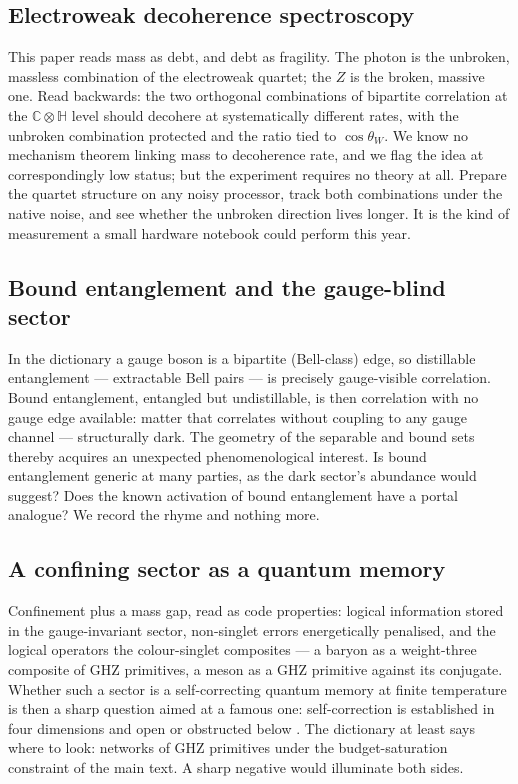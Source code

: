 \subsection{Electroweak decoherence spectroscopy}
\label{app:rev-ew}

This paper reads mass as debt, and debt as fragility. The photon is the unbroken,
massless combination of the electroweak quartet; the $Z$ is the broken, massive one.
Read backwards: the two orthogonal combinations of bipartite correlation at the
$\mathbb{C}\otimes\mathbb{H}$ level should decohere at systematically different rates,
with the unbroken combination protected and the ratio tied to $\cos\theta_{W}$. We know
no mechanism theorem linking mass to decoherence rate, and we flag the idea at
correspondingly low status; but the experiment requires no theory at all. Prepare the
quartet structure on any noisy processor, track both combinations under the native
noise, and see whether the unbroken direction lives longer. It is the kind of
measurement a small hardware notebook could perform this year.

\subsection{Bound entanglement and the gauge-blind sector}
\label{app:rev-bound}

In the dictionary a gauge boson is a bipartite (Bell-class) edge, so distillable
entanglement --- extractable Bell pairs \autocite{horodecki1998bound} --- is precisely
gauge-visible correlation. Bound entanglement, entangled but undistillable, is then
correlation with no gauge edge available: matter that correlates without coupling to any
gauge channel --- structurally dark. The geometry of the separable and bound sets
\autocite{zyczkowski1998volume} thereby acquires an unexpected phenomenological
interest. Is bound entanglement generic at many parties, as the dark sector's abundance
would suggest? Does the known activation of bound entanglement have a portal analogue?
We record the rhyme and nothing more.

\subsection{A confining sector as a quantum memory}
\label{app:rev-memory}

Confinement plus a mass gap, read as code properties: logical information stored in the
gauge-invariant sector, non-singlet errors energetically penalised, and the logical
operators the colour-singlet composites --- a baryon as a weight-three composite of GHZ
primitives, a meson as a GHZ primitive against its conjugate. Whether such a sector is a
self-correcting quantum memory at finite temperature is then a sharp question aimed at a
famous one: self-correction is established in four dimensions
\autocite{dennis2002topological} and open or obstructed below
\autocite{brown2016memories}. The dictionary at least says where to look: networks of
GHZ primitives under the budget-saturation constraint of the main text. A sharp negative
would illuminate both sides.

